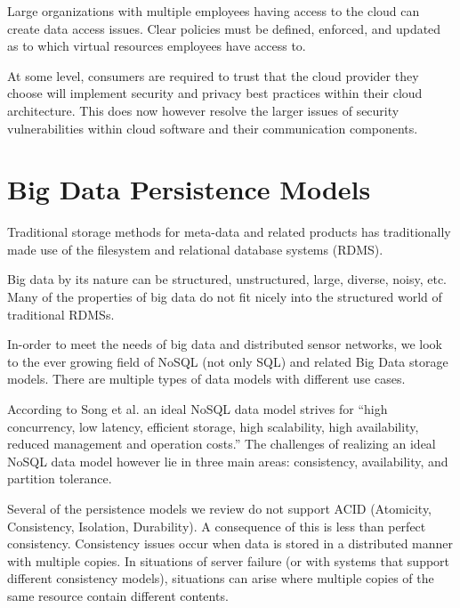 \documentclass[]{article}
\begin{document}
Large organizations with multiple employees having access to the cloud can create data access issues. Clear policies must be defined, enforced, and updated as to which virtual resources employees have access to. 

At some level, consumers are required to trust that the cloud provider they choose will implement security and privacy best practices within their cloud architecture. This does now however resolve the larger issues of security vulnerabilities within cloud software and their communication components.


\section{Big Data Persistence Models} \label{sec:big-data-persistence-models}
Traditional storage methods for meta-data and related products has traditionally made use of the filesystem and relational database systems (RDMS).

Big data by its nature can be structured, unstructured, large, diverse, noisy, etc. Many of the properties of big data do not fit nicely into the structured world of traditional RDMSs.

In-order to meet the needs of big data and distributed sensor networks, we look to the ever growing field of NoSQL (not only SQL) and related Big Data storage models. There are multiple types of data models with different use cases.

According to Song et al.\cite{5980904} an ideal NoSQL data model strives for ``high concurrency, low latency, efficient storage, high scalability, high availability, reduced management and operation costs.'' The challenges of realizing an ideal NoSQL data model however lie in three main areas\cite{chen_big_2014}: consistency, availability, and partition tolerance. 

Several of the persistence models we review do not support ACID (Atomicity, Consistency, Isolation, Durability). A consequence of this is less than perfect consistency. Consistency issues occur when data is stored in a distributed manner with multiple copies. In situations of server failure (or with systems that support different consistency models), situations can arise where multiple copies of the same resource contain different contents. 
\end{document}
